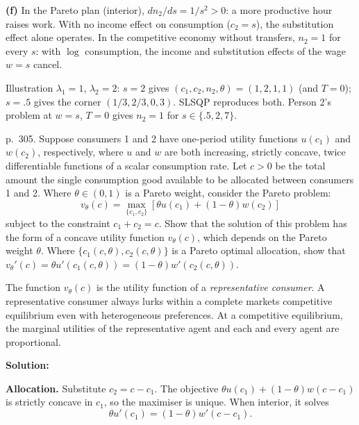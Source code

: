 \documentclass[12pt, letterpaper]{article}
\begin{document}
\begin{tcolorbox}[evenbox,title={Exercise 8.2 \quad Family economics, II}]
\textbf{(f)} In the Pareto plan (interior), $dn_2/ds=1/s^2>0$: a more productive hour raises work. With no income
effect on consumption ($c_2=s$), the substitution effect alone operates. In the competitive economy without
transfers, $n_2=1$ for every $s$: with $\log$ consumption, the income and substitution effects of the wage
$w=s$ cancel.

\begin{tcolorbox}[databox]
Illustration $\lambda_1=1$, $\lambda_2=2$: $s=2$ gives $(c_1,c_2,n_2,\theta)=(1,2,1,1)$ (and $T=0$);
$s=.5$ gives the corner $(1/3,2/3,0,3)$. SLSQP reproduces both. Person 2's problem at $w=s$, $T=0$ gives
$n_2=1$ for $s\in\{.5,2,7\}$.
\end{tcolorbox}
\end{tcolorbox}

\begin{tcolorbox}[oddbox,title={Exercise 8.3 \quad Existence of representative consumer}]
\begin{tcolorbox}[questionbox]
p.~305. Suppose consumers 1 and 2 have one-period utility functions $u(c_1)$ and $w(c_2)$, respectively,
where $u$ and $w$ are both increasing, strictly concave, twice differentiable functions of a scalar
consumption rate. Let $c>0$ be the total amount the single consumption good available to be allocated
between consumers 1 and 2. Where $\theta\in(0,1)$ is a Pareto weight, consider the Pareto problem:
\[
v_\theta(c)=\max_{\{c_1,c_2\}}[\theta u(c_1)+(1-\theta)w(c_2)]
\]
subject to the constraint $c_1+c_2=c$. Show that the solution of this problem has the form of a concave
utility function $v_\theta(c)$, which depends on the Pareto weight $\theta$. Where
$\{c_1(c,\theta),c_2(c,\theta)\}$ is a Pareto optimal allocation, show that
$v_\theta'(c)=\theta u'(c_1(c,\theta))=(1-\theta)w'(c_2(c,\theta))$.

The function $v_\theta(c)$ is the utility function of a \emph{representative consumer}. A representative
consumer always lurks within a complete markets competitive equilibrium even with heterogeneous
preferences. At a competitive equilibrium, the marginal utilities of the representative agent and each and
every agent are proportional.
\end{tcolorbox}

\textbf{Solution:}

\textbf{Allocation.} Substitute $c_2=c-c_1$. The objective $\theta u(c_1)+(1-\theta)w(c-c_1)$ is strictly
concave in $c_1$, so the maximiser is unique. When interior, it solves
\[
\theta u'(c_1)=(1-\theta)w'(c-c_1). \tag{1}
\]


\end{tcolorbox}
\end{document}
